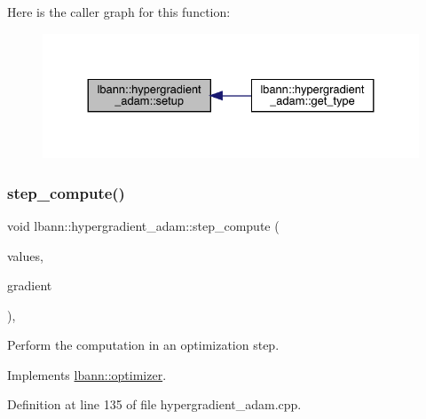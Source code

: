 Here is the caller graph for this function\+:\nopagebreak
\begin{figure}[H]
\begin{center}
\leavevmode
\includegraphics[width=330pt]{classlbann_1_1hypergradient__adam_acbc4aa4410eb2e7cb2fd9f423c4909dc_icgraph}
\end{center}
\end{figure}
\mbox{\label{classlbann_1_1hypergradient__adam_af9168cfd95707f361f0412ff2440761f}} 
\subsubsection{\texorpdfstring{step\+\_\+compute()}{step\_compute()}}
{\footnotesize\ttfamily void lbann\+::hypergradient\+\_\+adam\+::step\+\_\+compute (\begin{DoxyParamCaption}\item[{\hyperlink{base_8hpp_a9a697a504ae84010e7439ffec862b470}{Abs\+Dist\+Mat} \&}]{values,  }\item[{const \hyperlink{base_8hpp_a9a697a504ae84010e7439ffec862b470}{Abs\+Dist\+Mat} \&}]{gradient }\end{DoxyParamCaption})\hspace{0.3cm}{\ttfamily [override]}, {\ttfamily [virtual]}}

Perform the computation in an optimization step. 

Implements \hyperlink{classlbann_1_1optimizer_a0db72c298a0bc3405fb0af97d104a036}{lbann\+::optimizer}.



Definition at line 135 of file hypergradient\+\_\+adam.\+cpp.


